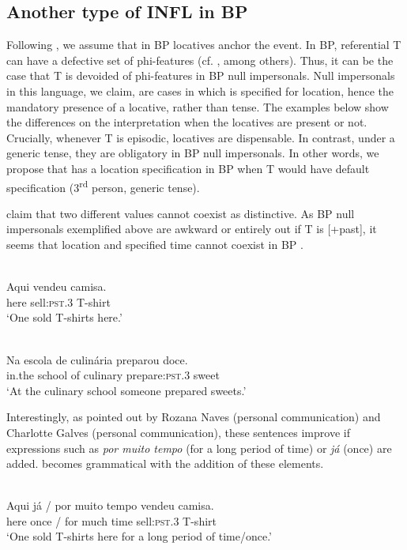 \documentclass[output=paper]{LSP/langsci}
\begin{document}
\subsection{Another type of INFL in BP}\label{§6.2.alexiadou}

Following \citet{RitterWiltschko2014}, we assume that in BP locatives anchor the event. In BP, referential T can have a defective set of phi-features (cf. \citealt{Ferreira2000,Nunes2008,Cyrino2011}, among others). Thus, it can be the case that T is devoided of phi-features in BP null impersonals. Null impersonals in this language, we claim, are cases in which  is specified for location, hence the mandatory presence of a locative, rather than tense. The examples below show the differences on the interpretation when the locatives are present or not. Crucially, whenever T is episodic, locatives are dispensable. In contrast, under a generic tense, they are obligatory in BP null impersonals. In other words, we propose that  has a location specification in BP when T would have default specification (3\textsuperscript{rd} person, generic tense).

\citet{RitterWiltschko2014} claim that two different  values cannot coexist as distinctive. As BP null impersonals exemplified above are awkward or entirely out if T is [+past], it seems that location and specified time cannot coexist in BP .


\ea\label{ex:42.alexiadou}
\\
\gll {\upshape *} Aqui vendeu camisa.\\
 {} here sell:\textsc{pst}.3 T-shirt\\
\glt ‘One sold T-shirts here.’
\z


\ea\label{ex:43.alexiadou}
\\
 Na escola de culinária preparou doce.\\
 {} in.the school of culinary prepare:\textsc{pst}.3 sweet\\
\glt ‘At the culinary school someone prepared sweets.’
\z


Interestingly, as pointed out by Rozana Naves (personal communication) and Charlotte Galves (personal communication), these sentences improve if expressions such as \textit{por muito tempo} (for a long period of time) or \textit{já} (once) are added.  becomes grammatical with the addition of these elements.


\ea\label{ex:44.alexiadou}
\\
\gll Aqui já / por muito tempo vendeu camisa.\\
 here once / for much time sell:\textsc{pst}.3 T-shirt\\
\glt ‘One sold T-shirts here for a long period of time/once.’
\z
\end{document}
